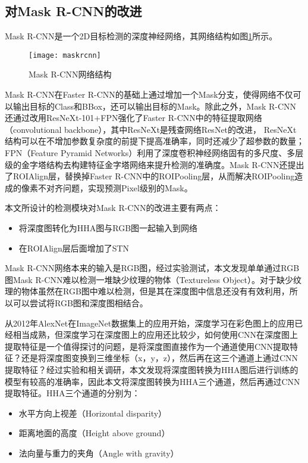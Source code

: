 \subsection{对Mask R-CNN的改进}
Mask R-CNN是一个2D目标检测的深度神经网络，其网络结构如图\ref{fig:mask_rcnn}所示。
\begin{figure}[ht]
  \centering
  \texttt{[image: maskrcnn]}
  \caption{Mask R-CNN网络结构}
  \label{fig:mask_rcnn}
\end{figure}
Mask R-CNN在Faster R-CNN的基础上通过增加一个Mask分支，使得网络不仅可以输出目标的Class和BBox，还可以输出目标的Mask。除此之外，Mask R-CNN还通过改用ResNeXt-101+FPN强化了Faster R-CNN中的特征提取网络（convolutional backbone），其中ResNeXt\cite{xie2017aggregated}是残查网络ResNet\cite{he2016deep}的改进， ResNeXt结构可以在不增加参数复杂度的前提下提高准确率，同时还减少了超参数的数量；FPN（Feature Pyramid Networks）\cite{lin2017feature}利用了深度卷积神经网络固有的多尺度、多层级的金字塔结构去构建特征金字塔网络来提升检测的准确度。Mask R-CNN还提出了ROIAlign层，替换掉Faster R-CNN中的ROIPooling层，从而解决ROIPooling造成的像素不对齐问题，实现预测Pixel级别的Mask。

本文所设计的检测模块对Mask R-CNN的改进主要有两点：
\begin{itemize}
\item 将深度图转化为HHA图与RGB图一起输入到网络
\item 在ROIAlign层后面增加了STN
\end{itemize}

Mask R-CNN网络本来的输入是RGB图，经过实验测试，本文发现单单通过RGB图Mask R-CNN难以检测一堆缺少纹理的物体（Textureless Object）。对于缺少纹理的物体虽然在RGB图中难以检测，但是其在深度图中信息还没有有效利用，所以可以尝试将RGB图和深度图相结合。

从2012年AlexNet\cite{Krizhevsky2012}在ImageNet\cite{imagenet}数据集上的应用开始，深度学习在彩色图上的应用已经相当成熟，但深度学习在深度图上的应用还比较少，如何使用CNN在深度图上提取特征是一个值得探讨的问题，是将深度图直接作为一个通道使用CNN提取特征？还是将深度图变换到三维坐标（x，y，z），然后再在这三个通道上通过CNN提取特征？经过实验和相关调研，本文发现将深度图转换为HHA图后进行训练的模型有较高的准确率\cite{Gupta2014}，因此本文将深度图转换为HHA三个通道，然后再通过CNN提取特征。HHA三个通道的分别为：
\begin{itemize}
\item 水平方向上视差（Horizontal disparity）
\item 距离地面的高度（Height above ground）
\item 法向量与重力的夹角（Angle with gravity）
\end{itemize}

